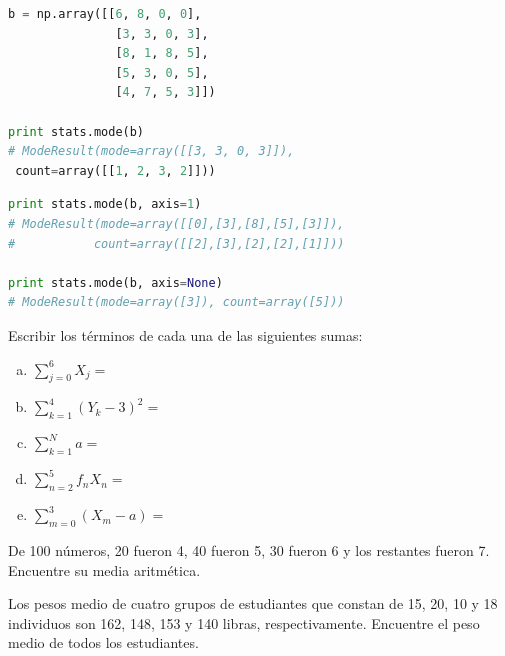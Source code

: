 \begin{lstlisting}[language=Python]
b = np.array([[6, 8, 0, 0],
               [3, 3, 0, 3],
               [8, 1, 8, 5],
               [5, 3, 0, 5],
               [4, 7, 5, 3]])

print stats.mode(b)
# ModeResult(mode=array([[3, 3, 0, 3]]),
 count=array([[1, 2, 3, 2]]))
\end{lstlisting}

\begin{lstlisting}[language=Python]
print stats.mode(b, axis=1)
# ModeResult(mode=array([[0],[3],[8],[5],[3]]),
#           count=array([[2],[3],[2],[2],[1]]))

print stats.mode(b, axis=None)
# ModeResult(mode=array([3]), count=array([5]))
\end{lstlisting}
 
%
 \begin{problema} \label{problema:3.1}
  Escribir los términos de cada una de las siguientes sumas:
  \begin{enumerate}[(a)]
    \item $\displaystyle\sum_{j=0}^{6}X_{j}=$ 
    \item $\displaystyle\sum_{k=1}^{4}\left( Y_{k}-3 \right)^{2}=$ 
   \item $\displaystyle\sum_{k=1}^{N}a=$ 
   \item $\displaystyle\sum_{n=2}^{5}{f_{n}}X_{n}= $ 
   \item $\displaystyle\sum_{m=0}^{3}\left( X_{m}-a \right)=$
  \end{enumerate}
%
%
 \end{problema}
%
 
 
  \begin{problema}
   \label{problema:3.10}
   De 100 números, 20 fueron 4, 40 fueron 5, 30 fueron 6 y los restantes fueron 7. Encuentre su media aritmética.
  \end{problema}

 

 
  \begin{problema}
   \label{problema:3.13}
   Los pesos medio de cuatro grupos de estudiantes que constan de 15, 20, 10 y 18 individuos son 162, 148, 153 y 140 libras, respectivamente. Encuentre el peso medio de todos los estudiantes.
  \end{problema}

 

%
 
